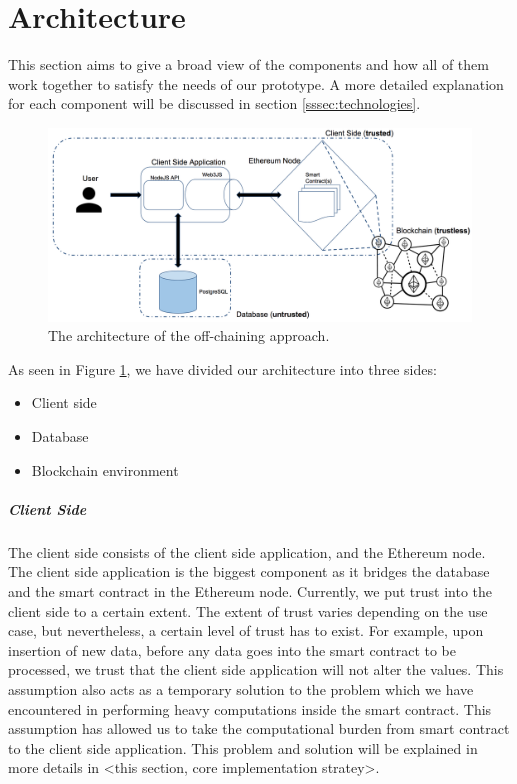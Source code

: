 \section{Architecture}

This section aims to give a broad view of the components and how all of them work together to satisfy the needs of our prototype. A more detailed explanation for each component will be discussed in section \ref{sssec:technologies}.

\begin{figure}[t]%
	\centering
	\includegraphics[width=1.0\textwidth]{images/architecture.png}
	\caption{\label{fig:architecture}The architecture of the off-chaining approach.}
\end{figure}

As seen in Figure \ref{fig:architecture}, we have divided our architecture into three sides:
\begin{itemize}
	\item Client side
	\item Database
	\item Blockchain environment
\end{itemize}

\subparagraph{Client Side}
The client side consists of the client side application, and the Ethereum node. The client side application is the biggest component as it bridges the database and the smart contract in the Ethereum node. Currently, we put trust into the client side to a certain extent. The extent of trust varies depending on the use case, but nevertheless, a certain level of trust has to exist. For example, upon insertion of new data, before any data goes into the smart contract to be processed, we trust that the client side application will not alter the values. This assumption also acts as a temporary solution to the problem which we have encountered in performing heavy computations inside the smart contract. This assumption has allowed us to take the computational burden from smart contract to the client side application. This problem and solution will be explained in more details in <this section, core implementation stratey>.

